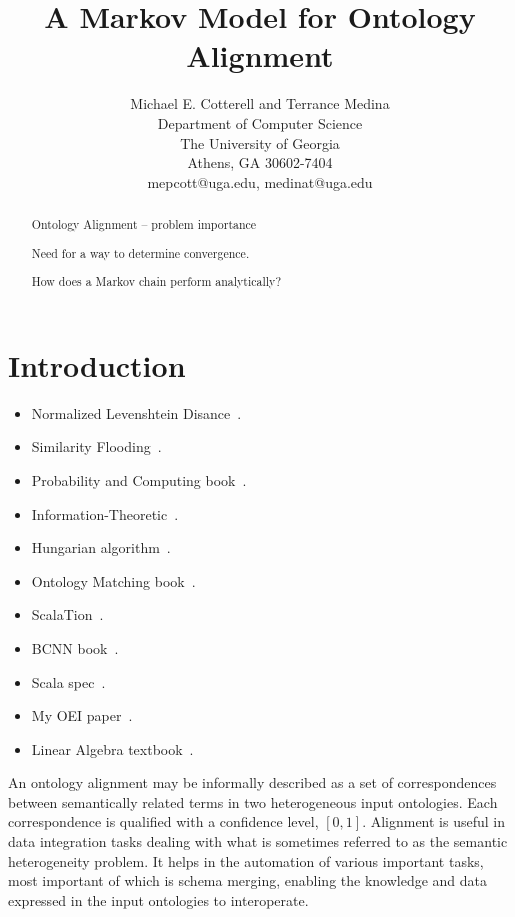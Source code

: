 \documentclass[letterpaper,twocolumn,12pt]{article}
\begin{document}
\newtheorem{defn}{Definition}

\title{A Markov Model for Ontology Alignment}

\author{Michael E. Cotterell and Terrance Medina \\
Department of Computer Science \\
The University of Georgia \\
Athens, GA 30602-7404 \\
mepcott@uga.edu, medinat@uga.edu
}

\maketitle

\begin{abstract}
Ontology Alignment -- problem importance

Need for a way to determine convergence.

How does a Markov chain perform analytically?

\end{abstract}


\section{Introduction}

\begin{itemize}
\item Normalized Levenshtein Disance~\cite{yujian:2007:levenshtein}. 
\item Similarity Flooding~\cite{melnik:2002:similarity}.
\item Probability and Computing book~\cite{mitzenmacher:2005:probability}.
\item Information-Theoretic~\cite{lin:1998:information}.
\item Hungarian algorithm~\cite{kuhn:1955:hungarian}.
\item Ontology Matching book~\cite{euzenat:2007:ontology}.
\item ScalaTion~\cite{miller:2010:scalation}.
\item BCNN book~\cite{bcnn:2010:simulation}.
\item Scala spec~\cite{odersky:2011:spec}.
\item My OEI paper~\cite{cotterell:2012:oei}.
\item Linear Algebra textbook~\cite{goodaire:2003:linalgebra}.
\end{itemize}

An ontology alignment may be informally described as a set of correspondences between semantically related terms in two heterogeneous input ontologies. 
Each correspondence is qualified with a confidence level, $[0,1]$.
Alignment is useful in data integration tasks dealing with what is sometimes referred to as the semantic heterogeneity problem. 
It helps in the automation of various important tasks, most important of which is schema merging, enabling the knowledge and data expressed in the input ontologies to interoperate. \\
\end{document}
